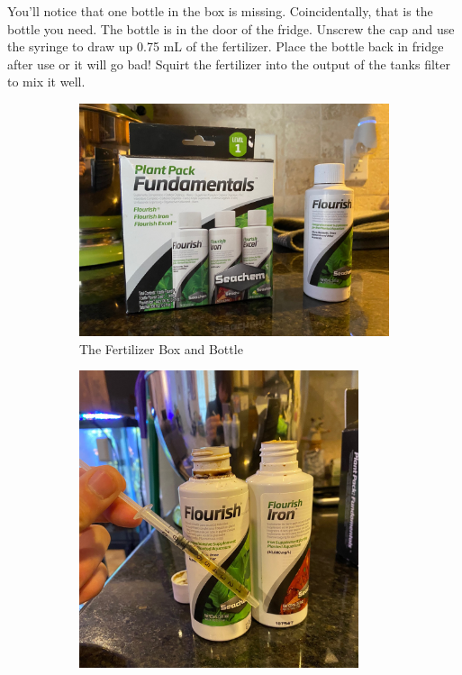 \documentclass{report}
\begin{document}
You'll notice that one bottle in the box is missing. Coincidentally, that is the bottle you need. The bottle is in the door 
of the fridge. Unscrew the cap and use the syringe to draw up 0.75 mL of the fertilizer. Place the bottle back in fridge after
use or it will go bad! Squirt the fertilizer into the output of the tanks filter to mix it well.

\begin{figure}[H]
    \centering
    \begin{subfigure}{0.8\textwidth}
        \centering
        \includegraphics[width=\textwidth]{FundamentalsNFlourish.jpg}
        \caption{The Fertilizer Box and Bottle}
    \end{subfigure}
    \vfill
    \begin{subfigure}{0.5\textwidth}
        \centering
        \includegraphics[width=0.9\textwidth]{FertsNSyringe.jpg}

\end{subfigure}
\end{figure}
\end{document}
